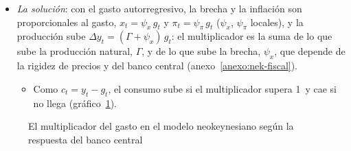 \documentclass[11pt]{article}
\begin{document}
\begin{itemize}
\item \emph{La solución}: con el gasto autorregresivo, la brecha y la inflación son proporcionales al gasto, $x_t=\psi_x\,g_t$ y $\pi_t=\psi_\pi\,g_t$ ($\psi_x$, $\psi_\pi$ locales), y la producción sube $\Delta y_t=(\Gamma+\psi_x)\,g_t$: el multiplicador es la suma de lo que sube la producción natural, $\Gamma$, y de lo que sube la brecha, $\psi_x$, que depende de la rigidez de precios y del banco central (anexo~\ref{anexo:nek-fiscal}).
  \begin{itemize}
  \item Como $c_t=y_t-g_t$, el consumo sube si el multiplicador supera 1~y cae si no llega (gráfico~\ref{fig:nek-gasto}).
  \end{itemize}
\end{itemize}

\begin{figure}[H]
\centering
\caption{El multiplicador del gasto en el modelo neokeynesiano según la respuesta del banco central}\label{fig:nek-gasto}
\end{figure}
\end{document}
